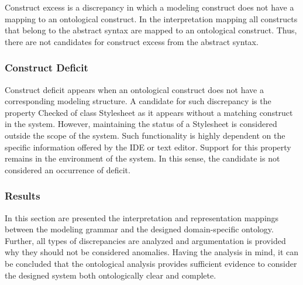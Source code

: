 Construct excess is a discrepancy in which a modeling construct does not have
a mapping to an ontological construct. In the interpretation mapping all
constructs that belong to the abstract syntax are mapped to an ontological
construct. Thus, there are not candidates for construct excess from the
abstract syntax.

\subsubsection{Construct Deficit}

Construct deficit appears when an ontological construct does not have a
corresponding modeling structure. A candidate for such discrepancy is the
property Checked of class Stylesheet as it appears without a matching
construct in the system. However, maintaining the status of a Stylesheet is
considered outside the scope of the system. Such functionality is highly
dependent on the specific information offered by the IDE or text editor.
Support for this property remains in the environment of the system. In this
sense, the candidate is not considered an occurrence of deficit.


\subsubsection{Results}

In this section are presented the interpretation and representation mappings
between the modeling grammar and the designed domain-specific ontology.
Further, all types of discrepancies are analyzed and argumentation is provided
why they should not be considered anomalies. Having the analysis in mind, it
can be concluded that the ontological analysis provides sufficient evidence to
consider the designed system both ontologically clear and complete.
